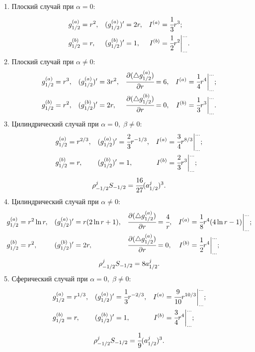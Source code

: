 1. Плоский случай при $\alpha = 0$:
\multeqstart
\begin{align*}
	g_{1/2}^{(a)} &= r^2, & (g_{1/2}^{(a)})' &= 2r, & I^{(a)} &= \cfrac{1}{3} r^3  {\text{;}} \\
	g_{1/2}^{(b)} &= r, & (g_{1/2}^{(b)})' &= 1, & I^{(b)} &= \cfrac{1}{2} r^2 {\bigg|_{...}^{...}} {\text{.}}
\end{align*}
2. Плоский случай при $\alpha \neq 0$:
\begin{align*}
	g_{1/2}^{(a)} &= r^3, & (g_{1/2}^{(a)})' &= 3r^2, & \cfrac{\partial (\triangle g_{1/2}^{(a)})}{\partial r} &= 6, & I^{(a)} &= \cfrac{1}{4} r^4 {\bigg|_{...}^{...}} {\text{;}} \\
	g_{1/2}^{(b)} &= r^2, & (g_{1/2}^{(b)})' &= 2r, & \cfrac{\partial (\triangle g_{1/2}^{(b)})}{\partial r} &= 0, & I^{(b)} &= \cfrac{1}{3} r^3 {\bigg|_{...}^{...}} {\text{.}}
\end{align*}
3. Цилиндрический случай при $\alpha = 0, \; \beta \neq 0$:
\begin{align*}
g_{1/2}^{(a)} &= r^{2/3}, & (g_{1/2}^{(a)})' &= \cfrac{2}{3} r^{-1/3}, & I^{(a)} &= \cfrac{3}{4} r^{8/3} {\bigg|_{...}^{...}} {\text{;}} \\
g_{1/2}^{(b)} &= r, & (g_{1/2}^{(b)})' &= 1, & I^{(b)} &= \cfrac{2}{3} r^3 {\bigg|_{...}^{...}} {\text{;}}
\end{align*}
\multeqnext
$$\rho_{-1/2}^j S_{-1/2} = \cfrac{16}{27} (a_{1/2}^j)^3 {\text{.}}$$
4. Цилиндрический случай при $\alpha \neq 0$:
\begin{align*}
	g_{1/2}^{(a)} &= r^2 \ln r, & (g_{1/2}^{(a)})' &= r (2 \ln r + 1), & \cfrac{\partial (\triangle g_{1/2}^{(a)})}{\partial r} &= \cfrac{4}{r}, & I^{(a)} &= \cfrac{1}{8} r^4 (4 \ln r - 1) {\bigg|_{...}^{...}} {\text{;}} \\
	g_{1/2}^{(b)} &= r^2, & (g_{1/2}^{(b)})' &= 2r, & \cfrac{\partial (\triangle g_{1/2}^{(a)})}{\partial r} &= 0, & I^{(b)} &= \cfrac{1}{2} r^4 {\bigg|_{...}^{...}} {\text{;}}
\end{align*}
\multeqnext
$$\rho_{-1/2}^j S_{-1/2} = 8 a_{1/2}^j {\text{.}}$$
5. Сферический случай при $\alpha = 0, \; \beta \neq 0$:
\begin{align*}
	g_{1/2}^{(a)} &= r^{1/3}, & (g_{1/2}^{(a)})' &= \cfrac{1}{3} r^{-2/3}, & I^{(a)} &= \cfrac{9}{10} r^{10/3} {\bigg|_{...}^{...}}  {\text{;}} \\
	g_{1/2}^{(b)} &= r, & (g_{1/2}^{(b)})' &= 1, & I^{(b)} &= \cfrac{3}{4} r^4 {\bigg|_{...}^{...}} {\text{;}}
\end{align*}
\multeqnext
$$\rho_{-1/2}^j S_{-1/2} = \cfrac{1}{9} (a_{1/2}^j)^3 {\text{.}}$$
\multeqfinish